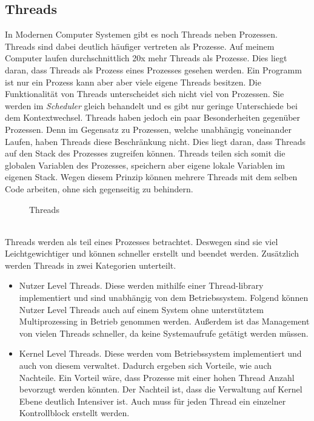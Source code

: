 \subsection{Threads}\label{Threads}
In Modernen Computer Systemen gibt es noch Threads neben Prozessen. Threads sind dabei deutlich häufiger vertreten als Prozesse. Auf meinem Computer laufen durchschnittlich 20x mehr Threads als Prozesse. Dies liegt daran, dass Threads als Prozess eines Prozesses gesehen werden. Ein Programm ist nur ein Prozess kann aber aber viele eigene Threads besitzen. Die Funktionalität von Threads unterscheidet sich nicht viel von Prozessen. Sie werden im \textit{Scheduler} gleich behandelt und es gibt nur geringe Unterschiede bei dem Kontextwechsel.
\medskip
\newline
Threads haben jedoch ein paar Besonderheiten gegenüber Prozessen. Denn im Gegensatz zu Prozessen, welche unabhängig voneinander Laufen, haben Threads diese Beschränkung nicht. Dies liegt daran, dass Threads auf den Stack des Prozesses zugreifen können. Threads teilen sich somit die globalen Variablen des Prozesses, speichern aber eigene lokale Variablen im eigenen Stack. Wegen diesem Prinzip können mehrere Threads mit dem selben Code arbeiten, ohne sich gegenseitig zu behindern.\cite{Threads:Williams}
\begin{figure}[h]
    \centering
    
    \caption{Threads}
\end{figure}
\\Threads werden als teil eines Prozesses betrachtet. Deswegen sind sie viel Leichtgewichtiger und können schneller erstellt und beendet werden. Zusätzlich werden Threads in zwei Kategorien unterteilt.
\begin{itemize}
    \item Nutzer Level Threads. Diese werden mithilfe einer Thread-library implementiert und sind unabhängig von dem Betriebssystem. Folgend können Nutzer Level Threads auch auf einem System ohne unterstütztem Multiprozessing in Betrieb genommen werden. Außerdem ist das Management von vielen Threads schneller, da keine Systemaufrufe getätigt werden müssen.
    \item Kernel Level Threads. Diese werden vom Betriebssystem implementiert und auch von diesem verwaltet. Dadurch ergeben sich Vorteile, wie auch Nachteile. Ein Vorteil wäre, dass Prozesse mit einer hohen Thread Anzahl bevorzugt werden könnten. Der Nachteil ist, dass die Verwaltung auf Kernel Ebene deutlich Intensiver ist. Auch muss für jeden Thread ein einzelner Kontrollblock erstellt werden. \cite{Threads:Dusey}
\end{itemize}

